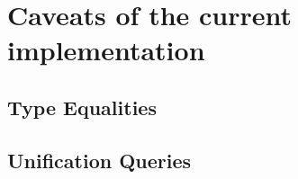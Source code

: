 \section{Caveats of the current implementation}
\subsection{Type Equalities}
\subsection{Unification Queries}
